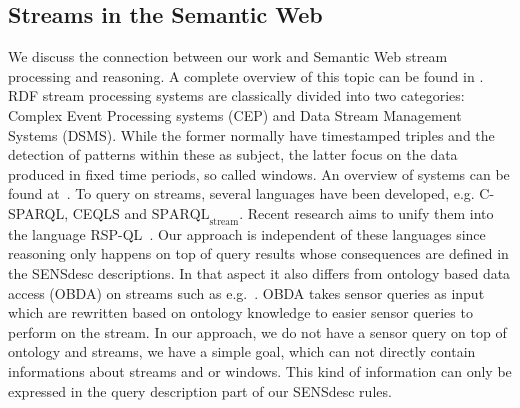\subsection{Streams in the Semantic Web}\label{rel}

We discuss the connection between our work and Semantic Web stream processing and reasoning. 
A complete overview of this topic can be found in \cite{streamreasoning}.
RDF stream processing systems are classically divided into two categories:
 Complex Event Processing systems (CEP) and Data Stream Management Systems (DSMS). 
 While the former normally have timestamped triples and the detection 
 of patterns within these as subject, the latter focus on the data produced in fixed time periods, so called windows. 
An overview of systems can be found at~\cite{streams}. 
To query on streams, 
several languages have been developed, e.g.  
C-SPARQL, CEQLS and $\text{SPARQL}_\text{stream}$. 
Recent research aims to unify them into the language RSP-QL~\cite{rspql-language}. 
Our approach is independent of these languages since reasoning only happens on top 
of query results whose consequences are defined in the SENSdesc descriptions. 
In that aspect it also differs from  ontology based data access (OBDA) on streams such as e.g.~\cite{obdaStream}. 
OBDA takes sensor queries as input which are rewritten based on ontology knowledge
to easier sensor queries to perform on the stream. 
In our approach, we do not have a sensor query on top of ontology and streams, 
we have a simple goal, which can not directly contain informations about streams and or windows. 
This kind of information can only be expressed in the query description part of our SENSdesc rules. 



